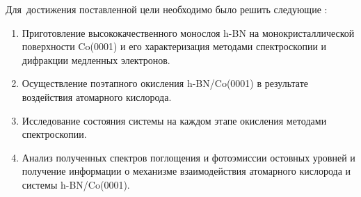 Для~достижения поставленной цели необходимо было решить следующие {\tasks}:
\begin{enumerate}
  \item Приготовление высококачественного монослоя h-BN на
  монокристаллической поверхности Co(0001) и его характеризация 
  методами спектроскопии и дифракции медленных электронов.
  \item Осуществление поэтапного окисления h-BN/Co(0001) в
  результате воздействия атомарного кислорода.
  \item Исследование состояния системы на каждом этапе окисления
  методами спектроскопии.
  \item Анализ полученных спектров поглощения и фотоэмиссии 
  остовных уровней и получение информации о механизме 
  взаимодействия атомарного кислорода и системы h-BN/Co(0001).
\end{enumerate}












